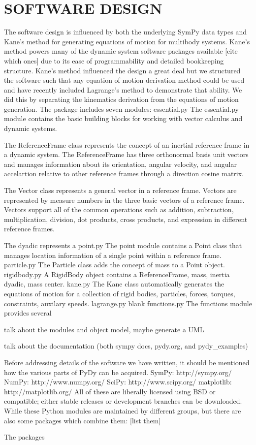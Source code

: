 \documentclass[twocolumn,10pt]{asme2e}
\begin{document}
\section*{SOFTWARE DESIGN}
The software design is influenced by both the underlying SymPy data types and
Kane’s method for generating equations of motion for multibody systems. Kane’s
method powers many of the dynamic system software packages available [cite
which ones] due to its ease of programmability and detailed bookkeeping
structure. Kane’s method influenced the design a great deal but we structured
the software such that any equation of motion derivation method could be used
and have recently included Lagrange’s method to demonstrate that ability. We
did this by separating the kinematics derivation from the equations of motion
generation. The package includes seven modules:
essential.py
The essential.py module contains the basic building blocks for working with
vector calculus and dynamic systems.

The ReferenceFrame class represents the concept of an inertial reference frame
in a dynamic system. The ReferenceFrame has three orthonormal basis unit
vectors and manages information about its orientation, angular velocity, and
angular accelartion relative to other reference frames through a direction
cosine matrix.

The Vector class represents a general vector in a reference frame. Vectors are
represented by measure numbers in the three basic vectors of a reference frame.
Vectors support all of the common operations such as addition, subtraction,
multiplication, division, dot products, cross products, and expression in
different reference frames.

The dyadic represents a
point.py
The point module contains a Point class that manages location information of a
single point within a reference frame.
particle.py
The Particle class adds the concept of mass to a Point object.
rigidbody.py
A RigidBody object contains a ReferenceFrame, mass, inertia dyadic, mass
center.
kane.py
The Kane class automatically generates the equations of motion for a collection
of rigid bodies, particles, forces, torques, constraints, auxilary speeds.
lagrange.py
blank
functions.py
The functions module provides several

talk about the modules and object model, maybe generate a UML

talk about the documentation (both sympy docs, pydy.org, and pydy_examples)

Before addressing details of the software we have written, it should be
mentioned how the various parts of PyDy can be acquired.
SymPy: http://sympy.org/
NumPy: http://www.numpy.org/
SciPy: http://www.scipy.org/
matplotlib: http://matplotlib.org/
All of these are liberally licensed using BSD or compatible; either stable
releases or development branches can be downloaded.
While these Python modules are maintained by different groups, but there are
also some packages which combine them:
[list them]

The packages
\end{document}
